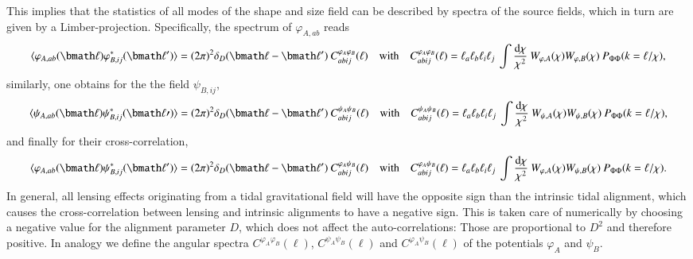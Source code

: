\documentclass[a4paper,fleqn,usenatbib]{mnras}
\newcommand{\bra}{\langle}
\newcommand{\ket}{\rangle}
\newcommand{\dd}{\mathrm{d}}
\newcommand{\dirac}{\delta_D}
\begin{document}
This implies that the statistics of all modes of the shape and size field can be described by spectra of the source fields, which in turn are given by a Limber-projection. Specifically, the spectrum of $\varphi_{A,ab}$ reads
\begin{equation}
\bra\varphi_{A,ab}(\bmath\ell)\varphi_{B,ij}^*(\bmath\ell^\prime)\ket = 
(2\pi)^2\dirac(\bmath\ell-\bmath\ell^\prime)\:C^{\varphi_A\varphi_B}_{abij}(\ell)
\quad\mathrm{with}\quad
C^{\varphi_A\varphi_B}_{abij}(\ell) = 
\ell_a\ell_b\ell_i\ell_j\:\int\frac{\dd\chi}{\chi^2}\:W_{\varphi,A}(\chi)W_{\varphi,B}(\chi)\:P_{\Phi\Phi}(k = \ell/\chi),
\end{equation}
similarly, one obtains for the the field $\psi_{B,ij}$,
\begin{equation}
\bra\psi_{A,ab}(\bmath\ell)\psi_{B,ij}^*(\bmath\ell\prime)\ket = 
(2\pi)^2\dirac(\bmath\ell-\bmath\ell^\prime)\:C^{\psi_A\psi_B}_{abij}(\ell)
\quad\mathrm{with}\quad
C^{\psi_A\psi_B}_{abij}(\ell) = 
\ell_a\ell_b\ell_i\ell_j\:\int\frac{\dd\chi}{\chi^2}\:W_{\psi,A}(\chi)W_{\psi,B}(\chi)\:P_{\Phi\Phi}(k = \ell/\chi),
\end{equation}
and finally for their cross-correlation,
\begin{equation}
\bra\varphi_{A,ab}(\bmath\ell)\psi_{B,ij}^*(\bmath\ell^\prime)\ket =
(2\pi)^2\dirac(\bmath\ell-\bmath\ell^\prime)\:C^{\varphi_A\psi_B}_{abij}(\ell)
\quad\mathrm{with}\quad
C^{\varphi_A\psi_B}_{abij}(\ell) =
\ell_a\ell_b\ell_i\ell_j\:\int\frac{\dd\chi}{\chi^2}\:W_{\varphi,A}(\chi)W_{\psi,B}(\chi)\:P_{\Phi\Phi}(k = \ell/\chi).
\end{equation}
In general, all lensing effects originating from a tidal gravitational field will have the opposite sign than the intrinsic tidal alignment, which causes the cross-correlation between lensing and intrinsic alignments to have a negative sign. This is taken care of numerically by choosing a negative value for the alignment parameter $D$, which does not affect the auto-correlations: Those are proportional to $D^2$ and therefore positive. In analogy we define the angular spectra $C^{\varphi_A\varphi_B}(\ell)$, $C^{\psi_A\psi_B}(\ell)$ and $C^{\varphi_A\psi_B}(\ell)$ of the potentials $\varphi_A$ and  $\psi_B$.


\end{document}
